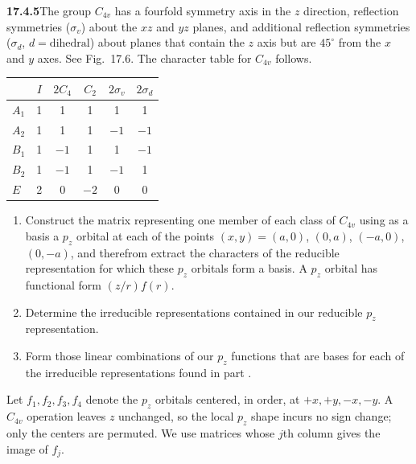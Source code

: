 \par\bigskip
\noindent\textbf{17.4.5}\quad The group $C_{4v}$ has a fourfold
symmetry axis in the $z$ direction, reflection symmetries
($\sigma_{v}$) about the $xz$ and $yz$ planes, and additional
reflection symmetries ($\sigma_{d}$, $d=\text{dihedral}$) about
planes that contain the $z$ axis but are $45^{\circ}$ from the $x$
and $y$ axes. See Fig.~17.6. The character table for $C_{4v}$
follows.
\begin{center}
\begin{tabular}{lccccc}
\toprule
& $I$ & $2C_{4}$ & $C_{2}$ & $2\sigma_{v}$ & $2\sigma_{d}$\\
\midrule
$A_{1}$ & 1 & 1 & 1 & 1 & 1\\
$A_{2}$ & 1 & 1 & 1 & $-1$ & $-1$\\
$B_{1}$ & 1 & $-1$ & 1 & 1 & $-1$\\
$B_{2}$ & 1 & $-1$ & 1 & $-1$ & 1\\
$E$ & 2 & 0 & $-2$ & 0 & 0\\
\bottomrule
\end{tabular}
\end{center}
\begin{enumerate}
\item[(a)] Construct the matrix representing one member of each class
of $C_{4v}$ using as a basis a $p_{z}$ orbital at each of the points
$(x,y)=(a,0)$, $(0,a)$, $(-a,0)$, $(0,-a)$, and therefrom extract the
characters of the reducible representation for which these $p_{z}$
orbitals form a basis. A $p_{z}$ orbital has functional form
$(z/r)f(r)$.
\item[(b)] Determine the irreducible representations contained in our
reducible $p_{z}$ representation.
\item[(c)] Form those linear combinations of our $p_{z}$ functions
that are bases for each of the irreducible representations found in
part .
\end{enumerate}
\par{}
\solution
Let $f_1,f_2,f_3,f_4$ denote the $p_z$ orbitals centered,
in order, at $+x,+y,-x,-y$.
A $C_{4v}$ operation leaves $z$ unchanged, so the local $p_z$
shape incurs no sign change; only the centers are permuted.
We use matrices whose $j$th column gives the image of $f_j$.

